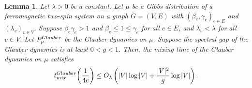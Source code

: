 \documentclass[10pt,a4paper]{amsart}
\newtheorem{lemma}{Lemma}
\newcommand{\tp}[1]{{\left( #1 \right)}}
\begin{document}
\begin{lemma}\label{lemma:warm-start-configuration-general}
Let $\lambda > 0$ be a constant. 
Let $\mu$ be a Gibbs distribution of a ferromagnetic two-spin system on a graph $G = (V,E)$ with $(\beta_e,\gamma_e)_{e\in E}$ and $(\lambda_v)_{v \in V}$. 
Suppose $\beta_e \gamma_e > 1$ and $\beta_e \leq 1 \leq \gamma_e$ for all $e \in E$, and $\lambda_v < \lambda$ for all $v \in V$.
Let $P_{\mu}^{\textnormal{Glauber}}$ be the Glauber dynamics on $\mu$. Suppose the spectral gap of the Glauber dynamics is at least $0 < g < 1$.  Then, the mixing time of the Glauber dynamics on $\mu$ satisfies
\begin{align*}
t_{\textnormal{mix}}^{\textnormal{Glauber}}\tp{\frac{1}{4e}} \leq O_{\lambda}\left(|V| \log |V| + \frac{|V|^2}{g} \log |V|\right).
\end{align*}
\end{lemma}
\end{document}
